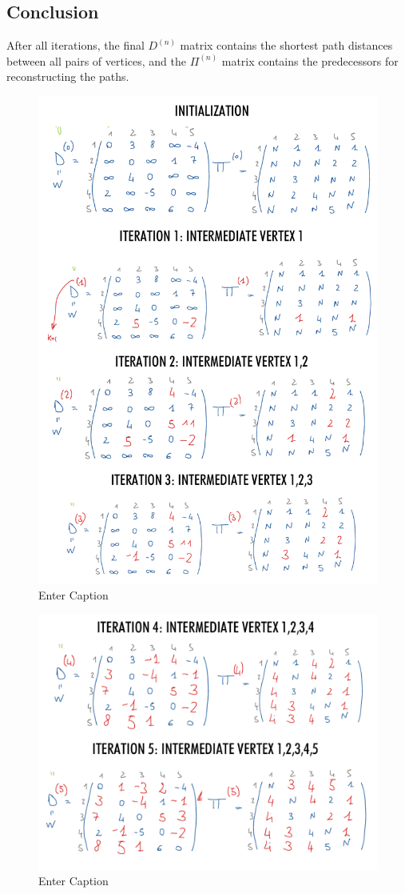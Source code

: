 \subsection{Conclusion}
After all iterations, the final \( D^{(n)} \) matrix contains the shortest path distances between all pairs of vertices, and the \( \Pi^{(n)} \) matrix contains the predecessors for reconstructing the paths.
\begin{figure}[h!]
    \centering
    \includegraphics[width=0.7\linewidth]{immagini//capitolo 14 esercizio/INITIALIZATION-1.png}
    \caption{Enter Caption}
    \label{fig:enter-label}
\end{figure}

\newpage
\begin{figure}[h!]
    \centering
    \includegraphics[width=0.75\linewidth]{immagini//capitolo 14 esercizio/INITIALIZATION-2.png}
    \caption{Enter Caption}
    \label{fig:enter-label}
\end{figure}

